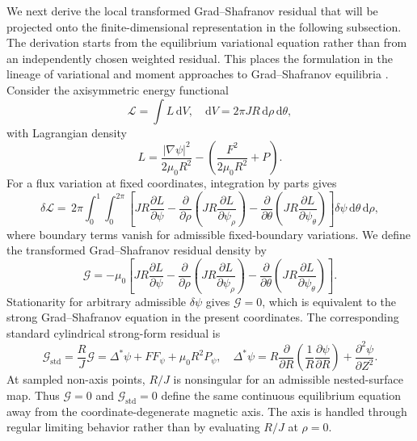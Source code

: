 \documentclass[final, 3p, times]{elsarticle}
\begin{document}
We next derive the local transformed Grad--Shafranov residual that will be projected onto the finite-dimensional representation in the following subsection. The derivation starts from the equilibrium variational equation rather than from an independently chosen weighted residual. This places the formulation in the lineage of variational and moment approaches to Grad--Shafranov equilibria \cite{Lao1981,Lao1984,Ludwig1995}. Consider the axisymmetric energy functional
\begin{equation}
    \mathcal{L}=\int L\,\mathrm{d}V,
    \quad
    \mathrm{d}V=2\pi JR\,\mathrm{d}\rho\,\mathrm{d}\theta,
\end{equation}
with Lagrangian density
\begin{equation}
    L = \frac{|\nabla\psi|^2}{2\mu_0R^2}
    - \left(\frac{F^2}{2\mu_0R^2}+P\right).
\end{equation}
For a flux variation at fixed coordinates, integration by parts gives
\begin{equation}
    \delta\mathcal{L}
    =\,2\pi\int_0^1\!\int_0^{2\pi}
    \left[
        JR\frac{\partial L}{\partial\psi}
        -\frac{\partial}{\partial\rho}\left(JR\frac{\partial L}{\partial\psi_\rho}\right)
        -\frac{\partial}{\partial\theta}\left(JR\frac{\partial L}{\partial\psi_\theta}\right)
        \right]\delta\psi\,
    \mathrm{d}\theta\,\mathrm{d}\rho,
\end{equation}
where boundary terms vanish for admissible fixed-boundary variations. We define the transformed Grad--Shafranov residual density by
\begin{equation}
    \mathcal{G}
    =-\mu_0\left[
        JR\frac{\partial L}{\partial\psi}
        -\frac{\partial}{\partial\rho}\left(JR\frac{\partial L}{\partial\psi_\rho}\right)
        -\frac{\partial}{\partial\theta}\left(JR\frac{\partial L}{\partial\psi_\theta}\right)
        \right].
\end{equation}
Stationarity for arbitrary admissible $\delta\psi$ gives $\mathcal{G}=0$, which is equivalent to the strong Grad--Shafranov equation in the present coordinates. The corresponding standard cylindrical strong-form residual is
\begin{equation}
    \mathcal{G}_{\mathrm{std}}
    =\frac{R}{J}\mathcal{G}
    =\Delta^{*}\psi+FF_\psi+\mu_0R^2P_\psi,
    \quad
    \Delta^{*}\psi
    =R\frac{\partial}{\partial R}\left(\frac{1}{R}\frac{\partial\psi}{\partial R}\right)
    +\frac{\partial^2\psi}{\partial Z^2}.
    \label{eq:standard-gs-residual}
\end{equation}
At sampled non-axis points, $R/J$ is nonsingular for an admissible nested-surface map. Thus $\mathcal{G}=0$ and $\mathcal{G}_{\mathrm{std}}=0$ define the same continuous equilibrium equation away from the coordinate-degenerate magnetic axis. The axis is handled through regular limiting behavior rather than by evaluating $R/J$ at $\rho=0$.
\end{document}
